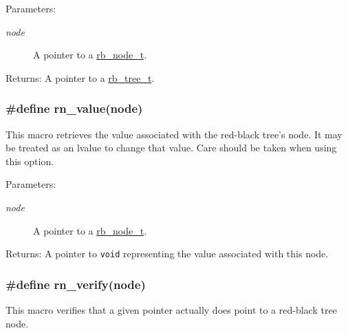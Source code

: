 \begin{Desc}
\item[Parameters:]
\begin{description}
\item[{\em node}]A pointer to a \hyperlink{group__dbprim__rbtree_a1}{rb\_\-node\_\-t}.\end{description}
\end{Desc}
\begin{Desc}
\item[Returns:]A pointer to a \hyperlink{group__dbprim__rbtree_a0}{rb\_\-tree\_\-t}. \end{Desc}
\hypertarget{group__dbprim__rbtree_a33}{
\subsubsection[rn\_\-value]{\setlength{\rightskip}{0pt plus 5cm}\#define rn\_\-value(node)}}
\label{group__dbprim__rbtree_a33}


This macro retrieves the value associated with the red-black tree's node. It may be treated as an lvalue to change that value. Care should be taken when using this option.

\begin{Desc}
\item[Parameters:]
\begin{description}
\item[{\em node}]A pointer to a \hyperlink{group__dbprim__rbtree_a1}{rb\_\-node\_\-t}.\end{description}
\end{Desc}
\begin{Desc}
\item[Returns:]A pointer to {\tt void} representing the value associated with this node. \end{Desc}
\hypertarget{group__dbprim__rbtree_a26}{
\subsubsection[rn\_\-verify]{\setlength{\rightskip}{0pt plus 5cm}\#define rn\_\-verify(node)}}
\label{group__dbprim__rbtree_a26}


This macro verifies that a given pointer actually does point to a red-black tree node.

